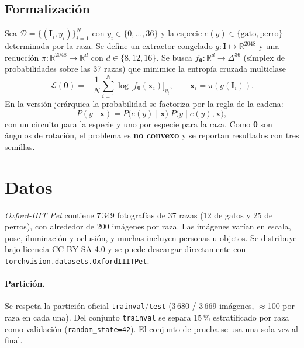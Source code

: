 \documentclass[11pt,letterpaper]{article}
\newcommand{\R}{\mathbb{R}}
\begin{document}
\subsection{Formalización}
Sea $\mathcal{D}=\{(\bm{I}_i,y_i)\}_{i=1}^{N}$ con $y_i\in\{0,\dots,36\}$ y la especie
$e(y)\in\{\text{gato},\text{perro}\}$ determinada por la raza. Se define un extractor congelado
$g:\bm{I}\mapsto\R^{2048}$ y una reducción $\pi:\R^{2048}\to\R^{d}$ con $d\in\{8,12,16\}$. Se busca
$f_{\bm\theta}:\R^{d}\to\Delta^{36}$ (símplex de probabilidades sobre las 37 razas) que minimice la
entropía cruzada multiclase
\begin{equation}
\mathcal{L}(\bm\theta)=-\frac{1}{N}\sum_{i=1}^{N}\log\big[f_{\bm\theta}(\bm{x}_i)\big]_{y_i},
\qquad \bm{x}_i=\pi(g(\bm{I}_i)).
\label{eq:loss}
\end{equation}
En la versión jerárquica la probabilidad se factoriza por la regla de la cadena:
\begin{equation}
P(y\mid\bm{x})=P\big(e(y)\mid\bm{x}\big)\;P\big(y\mid e(y),\bm{x}\big),
\label{eq:jerarquia}
\end{equation}
con un circuito para la especie y uno por especie para la raza. Como $\bm\theta$ son ángulos de
rotación, el problema es \textbf{no convexo} y se reportan resultados con tres semillas.

\section{Datos}
\emph{Oxford-IIIT Pet} \cite{parkhi2012} contiene 7\,349 fotografías de 37 razas (12 de gatos y 25 de
perros), con alrededor de 200 imágenes por raza. Las imágenes varían en escala, pose, iluminación y
oclusión, y muchas incluyen personas u objetos. Se distribuye bajo licencia CC BY-SA 4.0 y se puede
descargar directamente con \texttt{torchvision.datasets.OxfordIIITPet}.

\paragraph{Partición.} Se respeta la partición oficial \texttt{trainval}/\texttt{test}
(3\,680 / 3\,669 imágenes, $\approx$100 por raza en cada una). Del conjunto \texttt{trainval} se separa
15\,\% estratificado por raza como validación (\texttt{random\_state=42}). El conjunto de prueba se
usa una sola vez al final.
\end{document}
